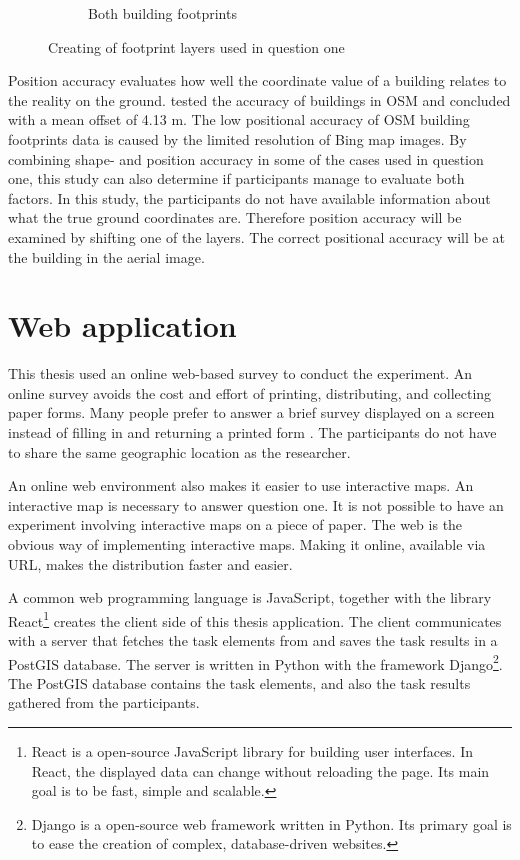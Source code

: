 \begin{figure}[H]
\begin{subfigure}[b]{0.32\textwidth}
		\caption{Both building footprints}
		\label{fig:build3.jpg}
	\end{subfigure}
	\caption{Creating of footprint layers used in question one}
	\label{fig:building_creation_example}
\end{figure}

Position accuracy evaluates how well the coordinate value of a building relates to the reality on the ground. \cite{Fan2014} tested the accuracy of buildings in OSM and concluded with a mean offset of 4.13 m. The low positional accuracy of OSM building footprints data is caused by the limited resolution of Bing map images. By combining shape- and position accuracy in some of the cases used in question one, this study can also determine if participants manage to evaluate both factors. In this study, the participants do not have available information about what the true ground coordinates are. Therefore position accuracy will be examined by shifting one of the layers. The correct positional accuracy will be at the building in the aerial image. 

\section{Web application}
This thesis used an online web-based survey to conduct the experiment. An online survey avoids the cost and effort of printing, distributing, and collecting paper forms. Many people prefer to answer a brief survey displayed on a screen instead of filling in and returning a printed form \citep{Ben2009}. The participants do not have to share the same geographic location as the researcher. 

An online web environment also makes it easier to use interactive maps. An interactive map is necessary to answer question one. It is not possible to have an experiment involving interactive maps on a piece of paper. The web is the obvious way of implementing interactive maps. Making it online, available via URL, makes the distribution faster and easier.

A common web programming language is JavaScript, together with the library React\footnote{React is a open-source JavaScript library for building user interfaces. In React, the displayed data can change without reloading the page. Its main goal is to be fast, simple and scalable.} creates the client side of this thesis application. The client communicates with a server that fetches the task elements from and saves the task results in a PostGIS database. The server is written in Python with the framework Django\footnote{Django is a open-source web framework written in Python. Its primary goal is to ease the creation of complex, database-driven websites.}. The PostGIS database contains the task elements, and also the task results gathered from the participants. 
 
